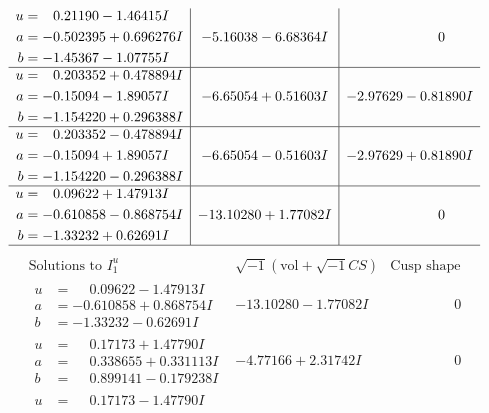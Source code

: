 \documentclass[1p]{elsarticle_modified}
\theoremstyle{definition}
\newcommand{\I}{\sqrt{-1}}
\begin{document}
$$\begin{array}{c|c|c}
\begin{aligned}
u &= \phantom{-}0.21190 - 1.46415 I \\
a &= -0.502395 + 0.696276 I \\
b &= -1.45367 - 1.07755 I\end{aligned}
 & -5.16038 - 6.68364 I & \phantom{-0.000000 } 0 \\ \hline\begin{aligned}
u &= \phantom{-}0.203352 + 0.478894 I \\
a &= -0.15094 - 1.89057 I \\
b &= -1.154220 + 0.296388 I\end{aligned}
 & -6.65054 + 0.51603 I & -2.97629 - 0.81890 I \\ \hline\begin{aligned}
u &= \phantom{-}0.203352 - 0.478894 I \\
a &= -0.15094 + 1.89057 I \\
b &= -1.154220 - 0.296388 I\end{aligned}
 & -6.65054 - 0.51603 I & -2.97629 + 0.81890 I \\ \hline\begin{aligned}
u &= \phantom{-}0.09622 + 1.47913 I \\
a &= -0.610858 - 0.868754 I \\
b &= -1.33232 + 0.62691 I\end{aligned}
 & -13.10280 + 1.77082 I & \phantom{-0.000000 } 0\\
 \hline 
 \end{array}$$\newpage$$\begin{array}{c|c|c}  
\text{Solutions to }I^u_{1}& \I (\text{vol} + \sqrt{-1}CS) & \text{Cusp shape}\\
 \hline 
\begin{aligned}
u &= \phantom{-}0.09622 - 1.47913 I \\
a &= -0.610858 + 0.868754 I \\
b &= -1.33232 - 0.62691 I\end{aligned}
 & -13.10280 - 1.77082 I & \phantom{-0.000000 } 0 \\ \hline\begin{aligned}
u &= \phantom{-}0.17173 + 1.47790 I \\
a &= \phantom{-}0.338655 + 0.331113 I \\
b &= \phantom{-}0.899141 - 0.179238 I\end{aligned}
 & -4.77166 + 2.31742 I & \phantom{-0.000000 } 0 \\ \hline\begin{aligned}
u &= \phantom{-}0.17173 - 1.47790 I \\

\end{aligned}
\end{array}$$
\end{document}
